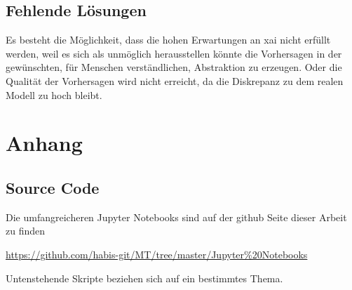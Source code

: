 \documentclass[
  12pt, %
  a4paper, %
  oneside, %
  openany, 
  numbers=noenddot, %
  BCOR=5mm, %
  parskip=half*, %
  thesis, %
]{bfhbook}
\begin{document}
\section{Fehlende Lösungen}
Es besteht die Möglichkeit, dass die hohen Erwartungen an \Gls{xai} nicht erfüllt werden, weil es sich als unmöglich herausstellen könnte die Vorhersagen in der gewünschten, für Menschen verständlichen, Abstraktion zu erzeugen. Oder die Qualität der Vorhersagen wird nicht erreicht, da die Diskrepanz zu dem realen Modell zu hoch bleibt.

\chapter{Anhang}
\section*{Source Code}
\label{dt-vis}

Die umfangreicheren Jupyter Notebooks sind auf der github Seite dieser Arbeit zu finden 

\url{https://github.com/habis-git/MT/tree/master/Jupyter\%20Notebooks}


Untenstehende Skripte beziehen sich auf ein bestimmtes Thema.
\end{document}
